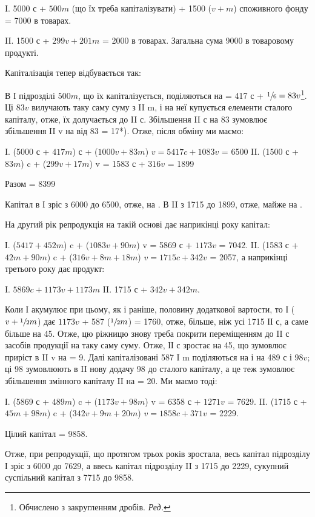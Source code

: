 I.  5000 с + $500 m$ (що їх треба капіталізувати) + 1500 ($v + m$) споживного
фонду = 7000 в товарах.

II.    1500 с + $299 v + 201 m$ = 2000 в товарах. Загальна сума 9000 в
товаровому продукті.

Капіталізація тепер відбувається так:

В І підрозділі $500 m$, що їх капіталізується, поділяються на  =
417 с + $\sfrac{1}{6} = 83 v$\footnote*{
Обчислено з закругленням дробів. \emph{Ред.}
}. Ці $83 v$ вилучають таку саму суму з II m, і на
неї купується елементи сталого капіталу, отже, їх долучається до II с.
Збільшення II с на 83 зумовлює збільшення II v на  від 83 = 17*).
Отже, після обміну ми маємо:

I. (5000 с + $417 m$) с + ($1000 v + 83 m$) $v = 5417 c + 1083 v$ = 6500
II. (1500 с + $83 m$) c + ($299 v + 17 m$) v = 1583 с + $316 v$ = 1899

Разом = 8399

Капітал в І зріс з 6000 до 6500, отже, на . В II з 1715 до 1899,
отже, майже на .

На другий рік репродукція на такій основі дає наприкінці року
капітал:

І. ($5417 + 452 m$) c + ($1083 v + 90 m$) v = 5869 с + $1173 v$ = 7042.
II. (1583 с + $42 m + 90 m$) c + ($316 v + 8m + 18 m$) $v = 1715 c + 342 v$ =
2057,
а наприкінці третього року дає продукт:

I. $5869 c + 1173 v + 1173 m$
II. 1715 с + $342 v + 342 m$.

Коли І акумулює при цьому, як і раніше, половину додаткової вартости,
то І ($v + \sfrac{1}{2} m$) дає $1173 v$ + 587 ($\sfrac{1}{2} m$) = 1760, отже, більше,
ніж усі 1715 ІІ с, а саме більше на 45. Отже, цю ріжницю знову треба
покрити переміщенням до II с засобів продукції на таку саму суму. Отже,
ІІ с зростає на 45, що зумовлює приріст в II v на  = 9. Далі капіталізовані
587 I m поділяються на  і  на 489 с і $98 v$; ці 98 зумовлюють
в II нову додачу 98 до сталого капіталу, а це теж зумовлює
збільшення змінного капіталу II на  = 20. Ми маємо тоді:

І. (5869 с + $489 m$) c + ($1173 v + 98 m$) v = 6358 с + $1271 v$ = 7629.
II. (1715 с + $45 m + 98 m$) c + ($342 v + 9 m + 20 m$) $v = 1858 c + 371 v$ = 2229.

Цілий капітал = 9858.

Отже, при репродукції, що протягом трьох років зростала,
весь капітал підрозділу І зріс з 6000 до 7629, а ввесь капітал підрозділу
II з 1715 до 2229, сукупний суспільний капітал з 7715 до 9858.
